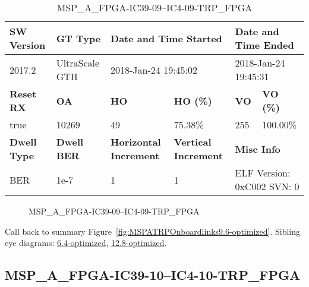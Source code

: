 \begin{table}[h]
\centering
\caption{MSP\_A\_FPGA-IC39-09--IC4-09-TRP\_FPGA}
\label{tab:MSPAFPGAIC3909IC409TRPFPGA9.6-optimized}
\begin{tabular}{@{}|l|l|l|l|l|l|@{}}
\toprule
\textbf{SW Version}                & \textbf{GT Type}   & \multicolumn{2}{l|}{\textbf{Date and Time Started}}            & \multicolumn{2}{l|}{\textbf{Date and Time Ended}}        \\ \midrule
2017.2                       & UltraScale GTH          & \multicolumn{2}{l|}{2018-Jan-24 19:45:02}                   & \multicolumn{2}{l|}{2018-Jan-24 19:45:31}               \\ \midrule
\textbf{Reset RX}                  & \textbf{OA} & \textbf{HO}   & \textbf{HO (\%)} & \textbf{VO} & \textbf{VO (\%)} \\ \midrule
true & 10269        & 49          & 75.38\%        & 255        & 100.00\%       \\ \midrule
\textbf{Dwell Type}                & \textbf{Dwell BER} & \textbf{Horizontal Increment} & \textbf{Vertical Increment}    & \multicolumn{2}{l|}{\textbf{Misc Info}}                  \\ \midrule
BER                            & 1e-7        & 1        & 1           & \multicolumn{2}{l|}{ELF Version: 0xC002 SVN: 0}                         \\ \bottomrule
\end{tabular}
\end{table}

\begin{figure}[h]
\caption{MSP\_A\_FPGA-IC39-09--IC4-09-TRP\_FPGA} \label{fig:MSPAFPGAIC3909IC409TRPFPGA9.6-optimized}
\end{figure}

Call back to summary Figure~\ref{fig:MSPATRPOnboardlinks9.6-optimized}.
Sibling eye diagrams: \hyperref[sec:MSPAFPGAIC3909IC409TRPFPGA6.4-optimized]{6.4-optimized}, \hyperref[sec:MSPAFPGAIC3909IC409TRPFPGA12.8-optimized]{12.8-optimized}.

\clearpage
\newpage


\subsection{MSP\_A\_FPGA-IC39-10--IC4-10-TRP\_FPGA}\label{sec:MSPAFPGAIC3910IC410TRPFPGA9.6-optimized}

